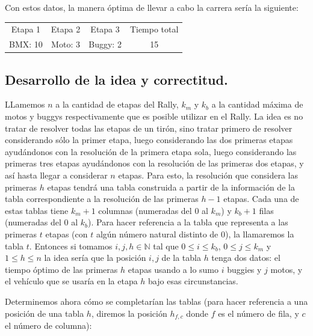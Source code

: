 Con estos datos, la manera óptima de llevar a cabo la carrera sería la siguiente:

\begin{table}[!ht]
\begin{center}
\begin{tabular}{| c | c | c | c |}
\hline
Etapa 1 & Etapa 2 & Etapa 3 & Tiempo total\\
BMX: 10 & Moto: 3 & Buggy: 2 & 15\\
\hline
\end{tabular}
\end{center}
\end{table}

\vspace*{0.6cm}
\subsection{Desarrollo de la idea y correctitud.}

\vspace*{0.3cm}

LLamemos $n$ a la cantidad de etapas del Rally, $k_{m}$ y $k_{b}$ a la cantidad máxima de motos y buggys respectivamente que es posible utilizar en el Rally. La idea es no tratar de resolver todas las etapas de un tirón, sino tratar primero de resolver considerando sólo la primer etapa, luego considerando las dos primeras etapas ayudándonos con la resolución de la primera etapa sola, luego considerando las primeras tres etapas ayudándonos con la resolución de las primeras dos etapas, y así hasta llegar a considerar $n$ etapas. Para esto, la resolución que considera las primeras $h$ etapas tendrá una tabla construida a partir de la información de la tabla correspondiente a la resolución de las primeras $h-1$ etapas. Cada una de estas tablas tiene $k_{m}+1$ columnas (numeradas del $0$ al $k_{m}$) y $k_{b}+1$ filas (numeradas del $0$ al $k_{b}$). Para hacer referencia a la tabla que representa a las primeras $t$ etapas (con $t$ algún número natural distinto de 0), la llamaremos la tabla $t$.  Entonces si tomamos $i,j,h \in \mathbb{N}$ tal que $0 \leq i \leq k_{b}$, $0 \leq j \leq k_{m}$ y $1 \leq h \leq n$ la idea sería que la posición $i,j$ de la tabla $h$ tenga dos datos: el tiempo óptimo de las primeras $h$ etapas usando a lo sumo $i$ buggies y $j$ motos, y el vehículo que se usaría en la etapa $h$ bajo esas circunstancias. 

Determinemos ahora cómo se completarían las tablas (para hacer referencia a una posición de una tabla $h$, diremos la posición $h_{f,c}$ donde $f$ es el número de fila, y $c$ el número de columna):

